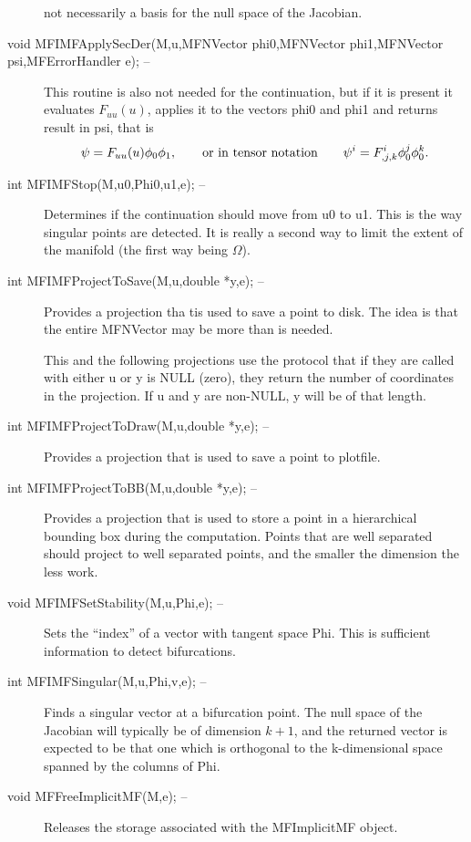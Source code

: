 \documentclass[12pt]{article}
\begin{document}
\begin{description}
        not necessarily a basis for the null space of the Jacobian.
     \item [void MFIMFApplySecDer(M,u,MFNVector phi0,MFNVector phi1,MFNVector psi,MFErrorHandler e); --]
        This routine is also not needed for the continuation, but if it is present it evaluates $F_{uu}(u)$, applies it to the
        vectors {phi0} and {phi1} and returns result in {psi}, that is
        \begin{displaymath}
          \psi = F_{uu}(u)\phi_0\phi_1,\qquad {\rm or~in~tensor~notation\qquad} \psi^i = F^i_{,j,k}\phi_0^j\phi_0^k.
        \end{displaymath}
     \item [int MFIMFStop(M,u0,Phi0,u1,e); --]
          Determines if the continuation should move from {u0} to {u1}. This is the way
          singular points are detected. It is really a second way to limit the extent of the
          manifold (the first way being $\Omega$).
     \item [int MFIMFProjectToSave(M,u,double *y,e); --]
          Provides a projection tha tis used to save a point to disk. The idea is that the
          entire {MFNVector} may be more than is needed.

          This and the following projections use the protocol that if they are called with
          either {u} or {y} is NULL (zero), they return the number of coordinates 
          in the projection. If {u} and {y} are non-NULL,  {y} will be of that length.
     \item [int MFIMFProjectToDraw(M,u,double *y,e); --]
          Provides a projection that is used to save a point to plotfile.
     \item [int MFIMFProjectToBB(M,u,double *y,e); --]
          Provides a projection that is used to store a point in a hierarchical bounding box
          during the computation. Points that are well separated should project to well
          separated points, and the smaller the dimension the less work.
     \item [void MFIMFSetStability(M,u,Phi,e); --]
          Sets the ``index'' of a vector with tangent space Phi. This is sufficient information
          to detect bifurcations.
     \item [int MFIMFSingular(M,u,Phi,v,e); --]
          Finds a singular vector at a bifurcation point. The null space of the Jacobian will
          typically be of dimension $k+1$, and the returned vector is expected to be that one which
          is orthogonal to the k-dimensional space spanned by the columns of Phi.
     \item [void MFFreeImplicitMF(M,e); --]
          Releases the storage associated with the {MFImplicitMF} object.
    \end{description}
\end{document}
